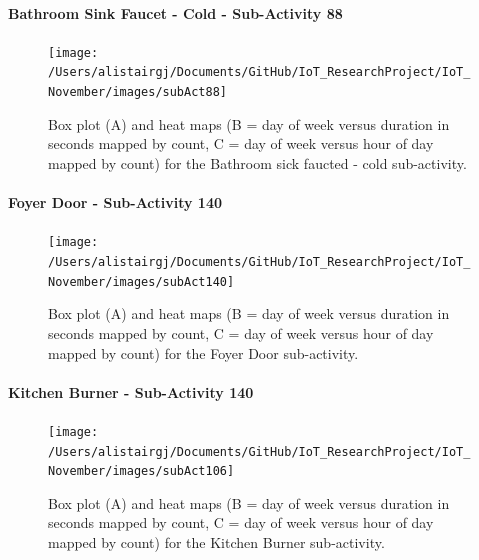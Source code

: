 \documentclass[11pt,]{article}
\let\oldparagraph\paragraph
\renewcommand{\paragraph}[1]{\oldparagraph{#1}\mbox{}}
\begin{document}
\hypertarget{bathroom-sink-faucet---cold---sub-activity-88}{%
\paragraph{Bathroom Sink Faucet - Cold - Sub-Activity
88}\label{bathroom-sink-faucet---cold---sub-activity-88}}

\begin{figure}[H]

{\centering \texttt{[image: /Users/alistairgj/Documents/GitHub/IoT\_ResearchProject/IoT\_November/images/subAct88]} 

}

\caption{Box plot (A) and heat maps (B = day of week versus duration in seconds mapped by count, C = day of week versus hour of day mapped by count) for the Bathroom sick faucted - cold sub-activity.}\label{fig:subAct88}
\end{figure}

\hypertarget{foyer-door---sub-activity-140}{%
\paragraph{Foyer Door - Sub-Activity
140}\label{foyer-door---sub-activity-140}}

\begin{figure}[H]

{\centering \texttt{[image: /Users/alistairgj/Documents/GitHub/IoT\_ResearchProject/IoT\_November/images/subAct140]} 

}

\caption{Box plot (A) and heat maps (B = day of week versus duration in seconds mapped by count, C = day of week versus hour of day mapped by count) for the Foyer Door sub-activity.}\label{fig:subAct140}
\end{figure}

\hypertarget{kitchen-burner---sub-activity-140}{%
\paragraph{Kitchen Burner - Sub-Activity
140}\label{kitchen-burner---sub-activity-140}}

\begin{figure}[H]

{\centering \texttt{[image: /Users/alistairgj/Documents/GitHub/IoT\_ResearchProject/IoT\_November/images/subAct106]} 

}

\caption{Box plot (A) and heat maps (B = day of week versus duration in seconds mapped by count, C = day of week versus hour of day mapped by count) for the Kitchen Burner sub-activity.}\label{fig:subAct106}
\end{figure}
\end{document}
